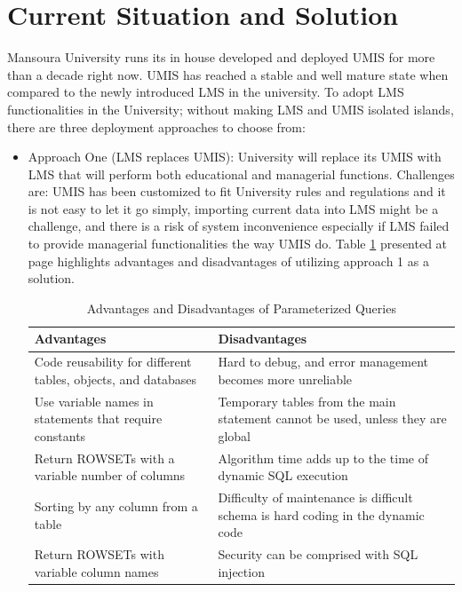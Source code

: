 \documentclass[12pt,a4paper,final,twoside,onecolumn,titlepage]{book}
\begin{document}
\section{Current Situation and Solution}
Mansoura University runs its in house developed and deployed \gls{UMIS} for more than a decade right now. \gls{UMIS} has reached a stable and well mature state when compared to the newly introduced \gls{LMS} in the university. To adopt \gls{LMS} functionalities in the University; without making \gls{LMS} and \gls{UMIS} isolated islands, there are three deployment approaches to choose from:
\begin{itemize}
\item Approach One (\gls{LMS} replaces \gls{UMIS}): University will replace its \gls{UMIS} with \gls{LMS} that will perform both educational and managerial functions. Challenges are: \gls{UMIS} has been customized to fit University rules and regulations and it is not easy to let it go simply, importing current data into \gls{LMS} might be a challenge, and there is a risk of system inconvenience especially if \gls{LMS} failed to provide managerial functionalities the way \gls{UMIS} do. Table \ref{App1} presented at page \pageref{App1} highlights advantages and disadvantages of utilizing approach 1 as a solution.

\begin{table}
\begin{center}
\caption{Advantages and Disadvantages of Parameterized Queries}
\begin{tabularx}{\textwidth}{|X|X|}
\hline Advantages & Disadvantages \\
\hline Code reusability for different tables, objects, and databases & 	Hard to debug, and error management becomes more unreliable\\
\hline Use variable names in statements that require constants & Temporary tables from the main statement cannot be used, unless they are global\\
\hline Return ROWSETs with a variable number of columns & Algorithm time adds up to the time of dynamic SQL execution\\
\hline Sorting by any column from a table	& Difficulty of maintenance is difficult schema is hard coding in the dynamic code\\
\hline Return ROWSETs with variable column names& Security can be comprised with SQL injection\\
\hline
\end{tabularx}
\end{center}
\label{App1}
\end{table}



\end{itemize}
\end{document}
